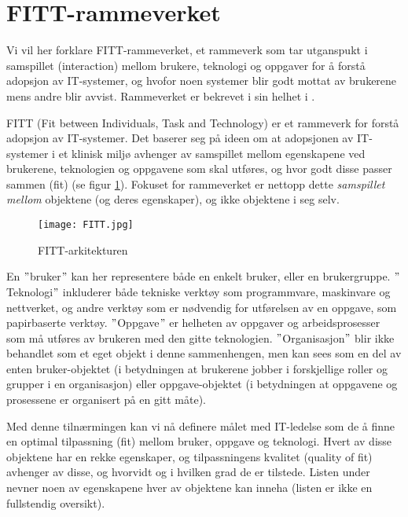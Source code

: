 \section{FITT-rammeverket}
\label{sec:fitt-remmeverket}

Vi vil her forklare FITT-rammeverket, et rammeverk som tar utganspukt i samspillet (interaction) mellom brukere, teknologi og oppgaver for å forstå adopsjon av IT-systemer, og hvofor noen systemer blir godt mottat av brukerene mens andre blir avvist. Rammeverket er bekrevet i sin helhet i \citep{FITT}.

\noindent
FITT (Fit between Individuals, Task and Technology) er et rammeverk for forstå adopsjon av IT-systemer. Det baserer seg på ideen om at adopsjonen av IT-systemer i et klinisk miljø avhenger av samspillet mellom egenskapene ved brukerene, teknologien og oppgavene som skal utføres, og hvor godt disse passer sammen (fit) (se figur \ref{FITT-arkitekturen}). Fokuset for rammeverket er nettopp dette  \emph{samspillet mellom} objektene (og deres egenskaper), og ikke objektene i seg selv.

\begin{figure}[H]
\centering
\texttt{[image: FITT.jpg]}
\caption{FITT-arkitekturen}
\label{FITT-arkitekturen}
\end{figure}

\noindent
En $"$bruker$"$ kan her representere både en enkelt bruker, eller en brukergruppe. $"$Teknologi$"$ inkluderer både tekniske verktøy som programmvare, maskinvare og nettverket, og andre verktøy som er nødvendig for utførelsen av en oppgave, som papirbaserte verktøy. $"$Oppgave$"$ er helheten av oppgaver og arbeidsprosesser som må utføres av brukeren med den gitte teknologien. $"$Organisasjon$"$ blir ikke behandlet som et eget objekt i denne sammenhengen, men kan sees som en del av enten bruker-objektet (i betydningen at brukerene jobber i forskjellige roller og grupper i en organisasjon) eller oppgave-objektet (i betydningen at oppgavene og prosessene er organisert på en gitt måte).

\noindent
Med denne tilnærmingen kan vi nå definere målet med IT-ledelse som de å finne en optimal tilpassning (fit) mellom bruker, oppgave og teknologi.
Hvert av disse objektene har en rekke egenskaper, og tilpassningens kvalitet (quality of fit) avhenger av disse, og hvorvidt og i hvilken grad de er tilstede. Listen under nevner noen av egenskapene hver av objektene kan inneha (listen er ikke en fullstendig oversikt). 

